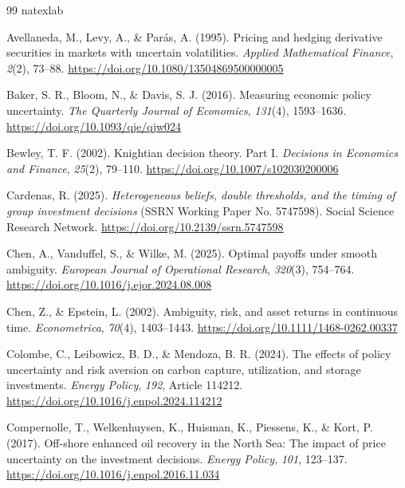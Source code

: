 \documentclass[5p,times,authoryear]{elsarticle}
\theoremstyle{plain}
\begin{document}
\begin{thebibliography}{99}
\expandafter\ifx\csname natexlab\endcsname\relax\def\natexlab#1{#1}\fi

Avellaneda, M., Levy, A., \& Par\'as, A. (1995). Pricing and hedging derivative securities in markets with uncertain volatilities. \emph{Applied Mathematical Finance}, \emph{2}(2), 73--88. \url{https://doi.org/10.1080/13504869500000005}

Baker, S. R., Bloom, N., \& Davis, S. J. (2016). Measuring economic policy uncertainty. \emph{The Quarterly Journal of Economics}, \emph{131}(4), 1593--1636. \url{https://doi.org/10.1093/qje/qjw024}

Bewley, T. F. (2002). Knightian decision theory. Part I. \emph{Decisions in Economics and Finance}, \emph{25}(2), 79--110. \url{https://doi.org/10.1007/s102030200006}

Cardenas, R. (2025). \emph{Heterogeneous beliefs, double thresholds, and the timing of group investment decisions} (SSRN Working Paper No. 5747598). Social Science Research Network. \url{https://doi.org/10.2139/ssrn.5747598}

Chen, A., Vanduffel, S., \& Wilke, M. (2025). Optimal payoffs under smooth ambiguity. \emph{European Journal of Operational Research}, \emph{320}(3), 754--764. \url{https://doi.org/10.1016/j.ejor.2024.08.008}

Chen, Z., \& Epstein, L. (2002). Ambiguity, risk, and asset returns in continuous time. \emph{Econometrica}, \emph{70}(4), 1403--1443. \url{https://doi.org/10.1111/1468-0262.00337}

Colombe, C., Leibowicz, B. D., \& Mendoza, B. R. (2024). The effects of policy uncertainty and risk aversion on carbon capture, utilization, and storage investments. \emph{Energy Policy}, \emph{192}, Article 114212. \url{https://doi.org/10.1016/j.enpol.2024.114212}

Compernolle, T., Welkenhuysen, K., Huisman, K., Piessens, K., \& Kort, P. (2017). Off-shore enhanced oil recovery in the North Sea: The impact of price uncertainty on the investment decisions. \emph{Energy Policy}, \emph{101}, 123--137. \url{https://doi.org/10.1016/j.enpol.2016.11.034}


\end{thebibliography}
\end{document}
